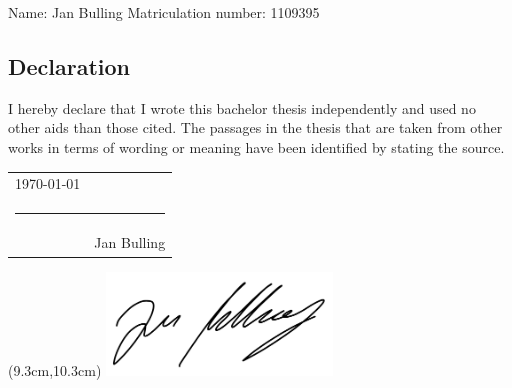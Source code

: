 \thispagestyle{empty}
{\footnotesize Name: Jan Bulling \hfill Matriculation number: 1109395}

\vspace{3cm}

\subsection*{Declaration}
I hereby declare that I wrote this bachelor thesis independently and used no other aids than those cited. The passages in the thesis that are taken from other works in terms of wording or meaning have been identified by stating the source.


\vspace*{4em}\noindent
\hfill
\begin{tabular}[t]{l r}
  \today & \\[-10pt]
  \multicolumn{2}{c}{\rule{30em}{0.4pt}} \\ 
  & Jan Bulling
\end{tabular}
\hfill\strut

\begin{textblock*}{6cm}(9.3cm,10.3cm) %
  \includegraphics[width=6cm]{signature.png}
\end{textblock*}